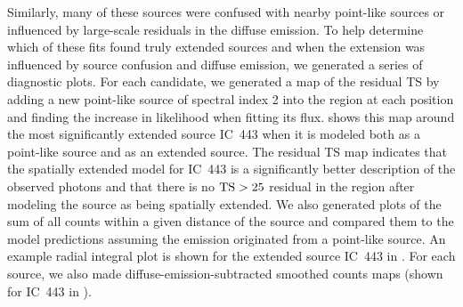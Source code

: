 Similarly, many of these sources were confused with nearby point-like
sources or influenced by large-scale residuals in the diffuse emission.
To help determine which of these fits found truly extended sources
and when the extension was influenced by source confusion and diffuse
emission, we generated a series of diagnostic plots.  For each candidate,
we generated a map of the residual TS by adding a new point-like source
of spectral index 2 into the region at each position and finding the
increase in likelihood when fitting its flux.  shows
this map around the most significantly extended source IC~443 when
it is modeled both as a point-like source and as an extended source.
The residual TS map indicates that the spatially extended model for
IC~443 is a significantly better description of the observed photons
and that there is no $\mathrm{TS}>25$ residual in the region after modeling the
source as being spatially extended.  We also generated plots of the
sum of all counts within a given distance of the source and compared
them to the model predictions assuming the emission originated from a
point-like source.  An example radial integral plot is shown for the
extended source IC~443 in .  For each source,
we also made diffuse-emission-subtracted smoothed counts maps (shown
for IC~443 in ).


